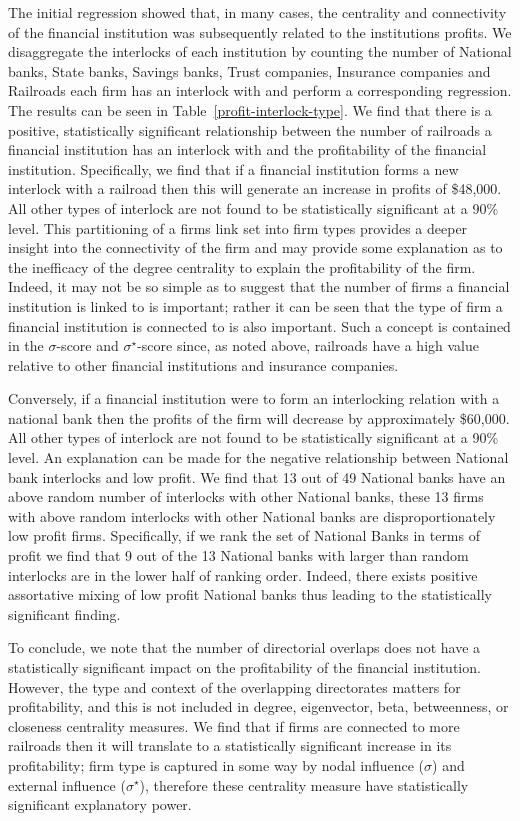 \documentclass[11pt,fleqn]{article}
\begin{document}
The initial regression showed that, in many cases, the centrality and connectivity of the financial institution was subsequently related to the institutions profits. We disaggregate the interlocks of each institution by counting the number of National banks, State banks, Savings banks, Trust companies, Insurance companies and Railroads each firm has an interlock with and perform a corresponding regression. The results can be seen in Table~\ref{profit-interlock-type}. We find that there is a positive, statistically significant relationship between the number of railroads a financial institution has an interlock with and the profitability of the financial institution. Specifically, we find that if a financial institution forms a new interlock with a railroad then this will generate an increase in profits of \$48,000. All other types of interlock are not found to be statistically significant at a 90\% level. This partitioning of a firms link set into firm types provides a deeper insight into the connectivity of the firm and may provide some explanation as to the inefficacy of the degree centrality to explain the profitability of the firm. Indeed, it may not be so simple as to suggest that the number of firms a financial institution is linked to is important; rather it can be seen that the type of firm a financial institution is connected to is also important. Such a concept is contained in the $\sigma$-score and $\sigma^{\star}$-score since, as noted above, railroads have a high value relative to other financial institutions and insurance companies.

Conversely, if a financial institution were to form an interlocking relation with a national bank then the profits of the firm will decrease by approximately \$60,000. All other types of interlock are not found to be statistically significant at a 90\% level. An explanation can be made for the negative relationship between National bank interlocks and low profit. We find that 13 out of 49 National banks have an above random number of interlocks with other National banks, these 13 firms with above random interlocks with other National banks are disproportionately low profit firms. Specifically, if we rank the set of National Banks in terms of profit we find that 9 out of the 13 National banks with larger than random interlocks are in the lower half of ranking order. Indeed, there exists positive assortative mixing of low profit National banks thus leading to the statistically significant finding.

To conclude, we note that the number of directorial overlaps does not have a statistically significant impact on the profitability of the financial institution. However, the type and context of the overlapping directorates matters for profitability, and this is not included in degree, eigenvector, beta, betweenness, or closeness centrality measures. We find that if firms are connected to more railroads then it will translate to a statistically significant increase in its profitability; firm type is captured in some way by nodal influence ($\sigma$) and external influence ($\sigma^{\star}$), therefore these centrality measure have statistically significant explanatory power.
\end{document}
